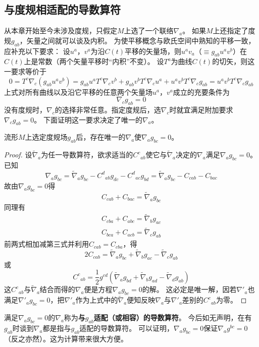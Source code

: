 \subsection{与度规相适配的导数算符}
从本章开始至今未涉及度规，只假定$M$上选了一个联络$\nabla_a$。
如果$M$上还指定了度规$g_{ab}$，矢量之间就可以谈及内积。
为使平移概念与欧氏空间中熟知的平移一致，应补充以下要求：
设$u^a$，$v^a$为沿$C(t)$平移的矢量场，则$u^av_a$（$\equiv g_{ab}u^av^b$）在$C(t)$上是常数（两个矢量平移时``内积''不变）。
设$T^a$为曲线$C(t)$的切矢，则这一要求等价于
$$0 = T^c\nabla_c(g_{ab}u^av^b) = g_{ab}u^aT^c\nabla_cv^b + g_{ab}v^bT^c\nabla_cu^a + u^av^bT^c\nabla_cg_{ab} = u^av^bT^c\nabla_cg_{ab}$$
上式对所有曲线以及沿它平移的任意两个矢量场$u^a$，$v^a$成立的充要条件为
$$\nabla_cg_{ab} = 0$$
没有度规时，$\nabla_c$的选择非常任意。指定度规后，选$\nabla_c$时就宜满足附加要求$\nabla_cg_{ab} = 0$。
下面证明这一要求决定了唯一的$\nabla_a$。

\begin{theorem}
流形$M$上选定度规场$g_{ab}$后，存在唯一的$\nabla_a$使$\nabla_ag_{bc} = 0$。
\end{theorem}

\begin{proof}
设$\tilde\nabla_a$为任一导数算符，欲求适当的$C^c{}_{ab}$使它与$\tilde\nabla_a$决定的$\nabla_a$满足$\nabla_ag_{bc} = 0$。
已知$$\nabla_ag_{bc} = \tilde\nabla_ag_{bc} - C^d{}_{ab}g_{dc} - C^d{}_{ac}g_{bd} = \tilde\nabla_ag_{bc} - C_{cab} - C_{bac}$$
故由$\nabla_ag_{bc} = 0$得$$C_{cab} + C_{bac} = \tilde\nabla_ag_{bc}$$
同理有\begin{gather*}
C_{cba} + C_{abc} = \tilde\nabla_bg_{ac} \\
C_{bca} + C_{acb} = \tilde\nabla_cg_{ab}
\end{gather*}
前两式相加减第三式并利用$C_{cab} = C_{cba}$，得
$$2C_{cab} = \tilde\nabla_ag_{bc} + \tilde\nabla_bg_{ac} - \tilde\nabla_cg_{ab}$$
或
$$C^c{}_{ab} = \frac{1}{2}g^{cd}(\tilde\nabla_ag_{bd} + \tilde\nabla_bg_{ad} - \tilde\nabla_dg_{ab})$$
这$C^c{}_{ab}$与$\tilde\nabla_a$结合而得的$\nabla_a$便是方程$\nabla_ag_{bc} = 0$的解。
这必定是唯一解，因若$\nabla'_a$也满足$\nabla'_ag_{bc} = 0$，把$\nabla'_a$作为上式中的$\tilde\nabla_a$便知反映$\nabla_a$与$\nabla'_a$差别的$C^c{}_{ab}$为零。
\end{proof}

满足$\nabla_ag_{bc} = 0$的$\nabla_a$称为\textbf{与$g_{ab}$适配（或相容）的导数算符}。
今后如无声明，在有$g_{ab}$时谈到$\nabla_a$都是指与$g_{ab}$适配的导数算符。
可以证明，$\nabla_ag_{bc} = 0$保证$\nabla_ag^{bc} = 0$（反之亦然）。这为计算带来很大方便。

